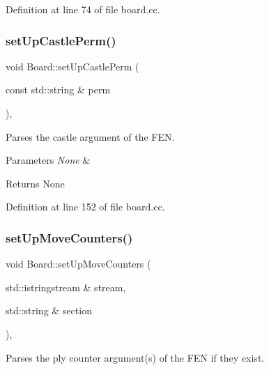 Definition at line 74 of file board.\+cc.

\mbox{\label{classBoard_acc2461d64efdfd469ec2dcada47c45b0}} 
\subsubsection{\texorpdfstring{set\+Up\+Castle\+Perm()}{setUpCastlePerm()}}
{\footnotesize\ttfamily void Board\+::set\+Up\+Castle\+Perm (\begin{DoxyParamCaption}\item[{const std\+::string \&}]{perm }\end{DoxyParamCaption})\hspace{0.3cm}{\ttfamily [private]}, {\ttfamily [noexcept]}}



Parses the castle argument of the F\+EN. 


\begin{DoxyParams}{Parameters}
{\em None} & \\
\hline
\end{DoxyParams}
\begin{DoxyReturn}{Returns}
None 
\end{DoxyReturn}


Definition at line 152 of file board.\+cc.

\mbox{\label{classBoard_a635ae307c20455554c2cea611c7561f1}} 
\subsubsection{\texorpdfstring{set\+Up\+Move\+Counters()}{setUpMoveCounters()}}
{\footnotesize\ttfamily void Board\+::set\+Up\+Move\+Counters (\begin{DoxyParamCaption}\item[{std\+::istringstream \&}]{stream,  }\item[{std\+::string \&}]{section }\end{DoxyParamCaption})\hspace{0.3cm}{\ttfamily [private]}, {\ttfamily [noexcept]}}



Parses the ply counter argument(s) of the F\+EN if they exist. 



